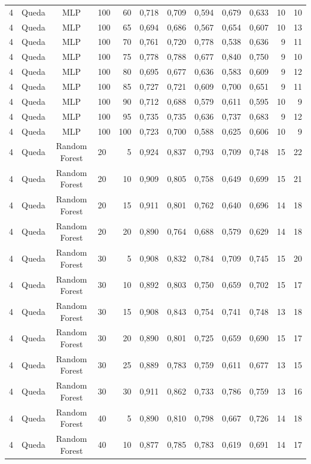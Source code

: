 \begin{longtable}{ccclrrrrrrrr}
4 & Queda & MLP & 100 & 60 & 0,718 & 0,709 & 0,594 & 0,679 & 0,633 & 10 & 10 \\
4 & Queda & MLP & 100 & 65 & 0,694 & 0,686 & 0,567 & 0,654 & 0,607 & 10 & 13 \\
4 & Queda & MLP & 100 & 70 & 0,761 & 0,720 & 0,778 & 0,538 & 0,636 & 9 & 11 \\
4 & Queda & MLP & 100 & 75 & 0,778 & 0,788 & 0,677 & 0,840 & 0,750 & 9 & 10 \\
4 & Queda & MLP & 100 & 80 & 0,695 & 0,677 & 0,636 & 0,583 & 0,609 & 9 & 12 \\
4 & Queda & MLP & 100 & 85 & 0,727 & 0,721 & 0,609 & 0,700 & 0,651 & 9 & 11 \\
4 & Queda & MLP & 100 & 90 & 0,712 & 0,688 & 0,579 & 0,611 & 0,595 & 10 & 9 \\
4 & Queda & MLP & 100 & 95 & 0,735 & 0,735 & 0,636 & 0,737 & 0,683 & 9 & 12 \\
4 & Queda & MLP & 100 & 100 & 0,723 & 0,700 & 0,588 & 0,625 & 0,606 & 10 & 9 \\
4 & Queda & Random Forest & 20 & 5 & 0,924 & 0,837 & 0,793 & 0,709 & 0,748 & 15 & 22 \\
4 & Queda & Random Forest & 20 & 10 & 0,909 & 0,805 & 0,758 & 0,649 & 0,699 & 15 & 21 \\
4 & Queda & Random Forest & 20 & 15 & 0,911 & 0,801 & 0,762 & 0,640 & 0,696 & 14 & 18 \\
4 & Queda & Random Forest & 20 & 20 & 0,890 & 0,764 & 0,688 & 0,579 & 0,629 & 14 & 18 \\
4 & Queda & Random Forest & 30 & 5 & 0,908 & 0,832 & 0,784 & 0,709 & 0,745 & 15 & 20 \\
4 & Queda & Random Forest & 30 & 10 & 0,892 & 0,803 & 0,750 & 0,659 & 0,702 & 15 & 17 \\
4 & Queda & Random Forest & 30 & 15 & 0,908 & 0,843 & 0,754 & 0,741 & 0,748 & 13 & 18 \\
4 & Queda & Random Forest & 30 & 20 & 0,890 & 0,801 & 0,725 & 0,659 & 0,690 & 15 & 17 \\
4 & Queda & Random Forest & 30 & 25 & 0,889 & 0,783 & 0,759 & 0,611 & 0,677 & 13 & 15 \\
4 & Queda & Random Forest & 30 & 30 & 0,911 & 0,862 & 0,733 & 0,786 & 0,759 & 13 & 16 \\
4 & Queda & Random Forest & 40 & 5 & 0,890 & 0,810 & 0,798 & 0,667 & 0,726 & 14 & 18 \\
4 & Queda & Random Forest & 40 & 10 & 0,877 & 0,785 & 0,783 & 0,619 & 0,691 & 14 & 17 \\

\end{longtable}
